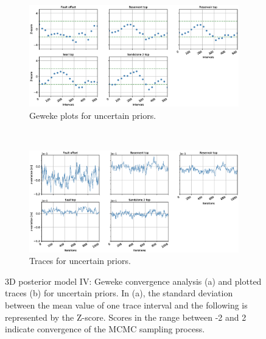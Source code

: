 \documentclass[a4paper,11pt]{MScThesis}
\begin{document}
	\begin{figure}[h]
		\begin{subfigure}{1\textwidth}
			\centering
			\includegraphics[width=1\linewidth]{Figures/Appendix/ML4/Geweke_ML4.eps}
			\caption{Geweke plots for uncertain priors.}
		\end{subfigure}%
		\\
		\begin{subfigure}{1\textwidth}
			\centering
			\includegraphics[width=1\linewidth]{Figures/Appendix/ML4/Traces_ML4.eps}
			\caption{Traces for uncertain priors.}
		\end{subfigure}
		\caption{3D posterior model IV: Geweke convergence analysis (a) and plotted traces (b) for uncertain priors. In (a), the standard deviation between the mean value of one trace interval and the following is represented by the Z-score. Scores in the range between -2 and 2 indicate convergence of the MCMC sampling process.}
		\label{fig:gew_ML4}
	\end{figure}
	
\end{document}
